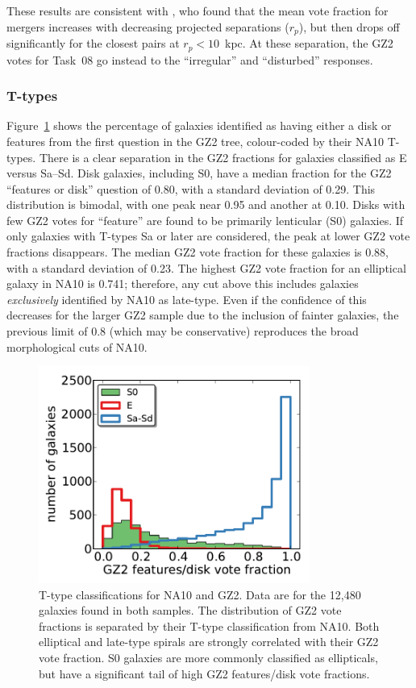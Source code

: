 \documentclass[useAMS,usenatbib]{mn2e}
\begin{document}
These results are consistent with \citet{cas13}, who found that the mean vote fraction for mergers increases with decreasing projected separations ($r_p$), but then drops off significantly for the closest pairs at $r_p < 10$~kpc. At these separation, the GZ2 votes for Task~08 go instead to the ``irregular'' and ``disturbed'' responses. 

\subsubsection{T-types}

Figure~\ref{fig-na_ttype} shows the percentage of galaxies identified as having either a disk or features from the first question in the GZ2 tree, colour-coded by their NA10 T-types. There is a clear separation in the GZ2 fractions for galaxies classified as E versus Sa--Sd. Disk galaxies, including S0, have a median fraction for the GZ2 ``features or disk'' question of 0.80, with a standard deviation of 0.29. This distribution is bimodal, with one peak near 0.95 and another at 0.10. Disks with few GZ2 votes for ``feature'' are found to be primarily lenticular (S0) galaxies. If only galaxies with T-types Sa or later are considered, the peak at lower GZ2 vote fractions disappears. The median GZ2 vote fraction for these galaxies is 0.88, with a standard deviation of 0.23. The highest GZ2 vote fraction for an elliptical galaxy in NA10 is 0.741; therefore, any cut above this includes galaxies {\it exclusively} identified by NA10 as late-type. Even if the confidence of this decreases for the larger GZ2 sample due to the inclusion of fainter galaxies, the previous limit of 0.8 (which may be conservative) reproduces the broad morphological cuts of NA10. 

\begin{figure}
\includegraphics[angle=0,width=3.5in]{figures/na_ttype.pdf}
\caption{T-type classifications for NA10 and GZ2. Data are for the 12,480 galaxies found in both samples. The distribution of GZ2 vote fractions is separated by their T-type classification from NA10. Both elliptical and late-type spirals are strongly correlated with their GZ2 vote fraction. S0 galaxies are more commonly classified as ellipticals, but have a significant tail of high GZ2 features/disk vote fractions. 
\label{fig-na_ttype}}
\end{figure}
\end{document}
